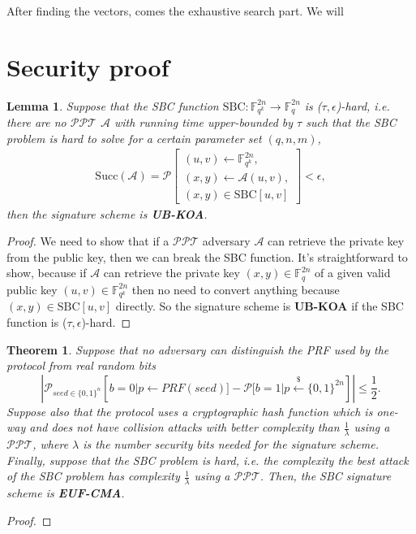 \documentclass[english]{article}
\newtheorem{theorem}{Theorem}[section]
\newtheorem{lemma}{Lemma}[section]
\begin{document}
		After finding the vectors, comes the exhaustive search part. We will 
		
\printbibliography

\appendix
\section{Security proof}\label{appendix:proof}
	\begin{lemma}
		Suppose that the SBC function $\text{SBC}: \mathbb{F}_{q^k}^{2n} \rightarrow \mathbb{F}_{q}^{2n}$ is ($\tau, \epsilon$)-hard, i.e. there are no $\mathcal{PPT}$ $\mathcal{A}$ with running time upper-bounded by $\tau$ such that the SBC problem is hard to solve for a certain parameter set $(q, n, m)$,
		\begin{align*}
			\text{Succ}(\mathcal{A}) = \mathcal{P}\left[
			\begin{array}{l}
				(u, v) \leftarrow \mathbb{F}_{q^k}^{2n}, \\
				(x, y) \leftarrow \mathcal{A}(u, v), \\
				(x, y) \in \text{SBC}[u, v]
			\end{array}
			\right] < \epsilon,
		\end{align*}
		then the signature scheme is \textbf{UB-KOA}.
	\end{lemma}
	\begin{proof}
		We need to show that if a $\mathcal{PPT}$ adversary $\mathcal{A}$ can retrieve the private key from the public key, then we can break the SBC function.
		It's straightforward to show, because if $\mathcal{A}$ can retrieve the private key $(x, y) \in \mathbb{F}_{q}^{2n}$ of a given valid public key $(u, v) \in \mathbb{F}_{q^k}^{2n}$ then no need to convert anything because $(x, y) \in \text{SBC}[u, v]$ directly. So the signature scheme is \textbf{UB-KOA} if the SBC function is ($\tau, \epsilon$)-hard.
	\end{proof}
	
	
	\begin{theorem}
		Suppose that no adversary can distinguish the PRF used by the protocol from real random bits
		$$
		| \mathcal{P}_{seed \in \{0,1\}^n}[b=0 | p \leftarrow PRF(seed)] - \mathcal{P}[b=1 | p \overset{{\scriptscriptstyle\$}}{\leftarrow} \{0,1\}^{2n}] | \leq \frac{1}{2}.
		$$
		Suppose also that the protocol uses a cryptographic hash function which is one-way and does not have collision attacks with better complexity than $\frac{1}{\lambda}$ using a $\mathcal{PPT}$, where $\lambda$ is the number security bits needed for the signature scheme.
		Finally, suppose that the SBC problem is hard, i.e. the complexity the best attack of the SBC problem has complexity $\frac{1}{\lambda}$ using a $\mathcal{PPT}$.
		Then, the SBC signature scheme is \textbf{EUF-CMA}.
	\end{theorem}
	\begin{proof}
		
	\end{proof}
\end{document}
